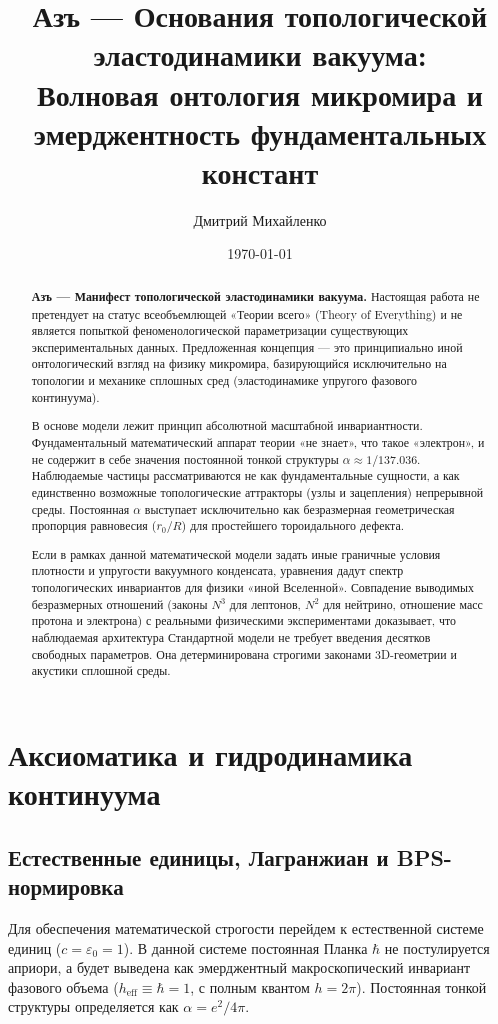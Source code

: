 \documentclass[11pt,a4paper]{article}
\title{\textbf{Азъ — Основания топологической эластодинамики вакуума:\\ Волновая онтология микромира и эмерджентность фундаментальных констант}}
\author{Дмитрий Михайленко}
\date{\today}
\begin{document}
	
	\maketitle

\begin{abstract}
\textbf{Азъ — Манифест топологической эластодинамики вакуума.} 
Настоящая работа не претендует на статус всеобъемлющей «Теории всего» (Theory of Everything) и не является попыткой феноменологической параметризации существующих экспериментальных данных. Предложенная концепция — это принципиально иной онтологический взгляд на физику микромира, базирующийся исключительно на топологии и механике сплошных сред (эластодинамике упругого фазового континуума).

В основе модели лежит принцип абсолютной масштабной инвариантности. Фундаментальный математический аппарат теории «не знает», что такое «электрон», и не содержит в себе значения постоянной тонкой структуры $\alpha \approx 1/137.036$. Наблюдаемые частицы рассматриваются не как фундаментальные сущности, а как единственно возможные топологические аттракторы (узлы и зацепления) непрерывной среды. Постоянная $\alpha$ выступает исключительно как безразмерная геометрическая пропорция равновесия ($r_0/R$) для простейшего тороидального дефекта. 

Если в рамках данной математической модели задать иные граничные условия плотности и упругости вакуумного конденсата, уравнения дадут спектр топологических инвариантов для физики «иной Вселенной». Совпадение выводимых безразмерных отношений (законы $N^3$ для лептонов, $N^2$ для нейтрино, отношение масс протона и электрона) с реальными физическими экспериментами доказывает, что наблюдаемая архитектура Стандартной модели не требует введения десятков свободных параметров. Она детерминирована строгими законами 3D-геометрии и акустики сплошной среды.
\end{abstract}

\section{Аксиоматика и гидродинамика континуума}

\subsection{Естественные единицы, Лагранжиан и BPS-нормировка}
Для обеспечения математической строгости перейдем к естественной системе единиц ($c = \varepsilon_0 = 1$). В данной системе постоянная Планка $\hbar$ не постулируется априори, а будет выведена как эмерджентный макроскопический инвариант фазового объема ($h_{\text{eff}} \equiv \hbar = 1$, с полным квантом $h = 2\pi$). Постоянная тонкой структуры определяется как $\alpha = e^2 / 4\pi$.
\end{document}
